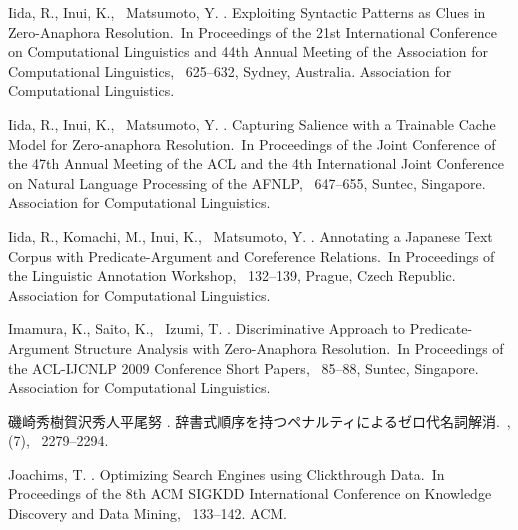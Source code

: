 \documentclass[japanese]{jnlp_1.4}
\begin{document}
\begin{thebibliography}{}
Iida, R., Inui, K., \BBA\ Matsumoto, Y. \BBCP.
\newblock \BBOQ Exploiting Syntactic Patterns as Clues in Zero-Anaphora
  Resolution.\BBCQ\
\newblock In {\Bem Proceedings of the 21st International Conference on
  Computational Linguistics and 44th Annual Meeting of the Association for
  Computational Linguistics}, \mbox{\BPGS\ 625--632}, Sydney, Australia.
  Association for Computational Linguistics.

Iida, R., Inui, K., \BBA\ Matsumoto, Y. \BBCP.
\newblock \BBOQ Capturing Salience with a Trainable Cache Model for
  Zero-anaphora Resolution.\BBCQ\
\newblock In {\Bem Proceedings of the Joint Conference of the 47th Annual
  Meeting of the ACL and the 4th International Joint Conference on Natural
  Language Processing of the AFNLP}, \mbox{\BPGS\ 647--655}, Suntec, Singapore.
  Association for Computational Linguistics.

Iida, R., Komachi, M., Inui, K., \BBA\ Matsumoto, Y. \BBOP 2007\BBCP.
\newblock \BBOQ Annotating a Japanese Text Corpus with Predicate-Argument and
  Coreference Relations.\BBCQ\
\newblock In {\Bem Proceedings of the Linguistic Annotation Workshop},
  \mbox{\BPGS\ 132--139}, Prague, Czech Republic. Association for Computational
  Linguistics.

Imamura, K., Saito, K., \BBA\ Izumi, T. \BBCP.
\newblock \BBOQ Discriminative Approach to Predicate-Argument Structure
  Analysis with Zero-Anaphora Resolution.\BBCQ\
\newblock In {\Bem Proceedings of the ACL-IJCNLP 2009 Conference Short Papers},
  \mbox{\BPGS\ 85--88}, Suntec, Singapore. Association for Computational
  Linguistics.

\bibitem[\protect\BCAY{磯崎\JBA 賀沢\JBA 平尾}{磯崎 \Jetal
  }{2006}]{磯崎秀樹:2006-07-15}
磯崎秀樹\JBA 賀沢秀人\JBA 平尾努 \BBCP.
\newblock 辞書式順序を持つペナルティによるゼロ代名詞解消.\
\newblock {}, {}  (7), \mbox{\BPGS\ 2279--2294}.

Joachims, T. \BBOP 2002\BBCP.
\newblock \BBOQ Optimizing Search Engines using Clickthrough Data.\BBCQ\
\newblock In {\Bem Proceedings of the 8th ACM SIGKDD International Conference
  on Knowledge Discovery and Data Mining}, \mbox{\BPGS\ 133--142}. ACM.


\end{thebibliography}
\end{document}
